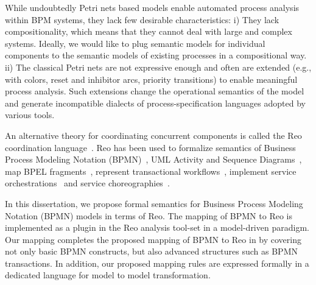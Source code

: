 While undoubtedly Petri nets based models enable automated process analysis within BPM systems, they lack few desirable characteristics:
i) %
They lack compositionality, which means that they cannot deal with large and complex systems. Ideally, we would like to plug semantic models for individual components to the semantic models of existing processes in a compositional way.
ii) The classical Petri nets are not expressive enough and often are extended (e.g., with colors, reset and inhibitor arcs, priority transitions) to enable meaningful process analysis. Such extensions change the operational semantics of the model and generate incompatible dialects of process-specification languages adopted by various tools.%

An alternative theory for coordinating concurrent components is called the Reo coordination language~\cite{Arbab04RCC}. Reo has been used to formalize semantics of 
 Business Process Modeling Notation (BPMN)~\cite{bpmn2reo},
UML Activity and Sequence Diagrams~\cite{behnaz}, map BPEL fragments~\cite{Schumm2010}, represent transactional workflows~\cite{natallialong}, implement service orchestrations~\cite{Jongmans2012} and service  choreographies~\cite{Meng:2007:WSC:1244002.1244085}. 

In this dissertation, we propose formal semantics for Business Process Modeling Notation (BPMN) models in terms of Reo. The mapping of BPMN to Reo is implemented as a plugin in the Reo analysis tool-set in a {model-driven} paradigm. Our mapping completes the proposed mapping of BPMN to Reo in \cite{bpmn2reo} by covering not only basic BPMN constructs, but also advanced structures such as BPMN transactions. In addition, our proposed mapping rules are expressed formally in a dedicated language for model to model transformation.

